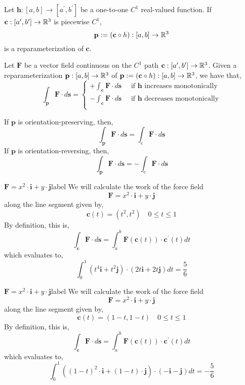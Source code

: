 \begin{defn}[Reparameterization]
	Let $\mathbf{h}:[a,b]\rightarrow[a^{\prime},b^{\prime}]$ be a one-to-one $C^1$ real-valued function. If $\mathbf{c}:[a^{\prime},b^{\prime}] \rightarrow \mathbb{R}^3$ is piecewise $C^1$,
	\[\mathbf{p} := (\mathbf{c} \circ h) : [a,b] \rightarrow \mathbb{R}^3\]
	is a reparameterization of $\mathbf{c}$.
\end{defn}

\begin{thm}
	Let $\mathbf{F}$ be a vector field continuous on the $C^1$ path $\mathbf{c}:[a^{\prime},b^{\prime}] \rightarrow \mathbb{R}^3$. Given a reparameterization $\mathbf{p}:[a,b] \rightarrow \mathbb{R}^3$ of $\mathbf{p} := (\mathbf{c} \circ h) : [a,b] \rightarrow \mathbb{R}^3$, we have that,
		\[\int_{\mathbf{p}} \mathbf{F} \cdot d \mathbf{s}=\left\{\begin{array}{c}
		+\int_{\mathbf{c}}\mathbf{F} \cdot d \mathbf{s} \quad \text { if } \mathbf{h} \text{ increases monotonically} \\
		- \int_{\mathbf{c}}\mathbf{F} \cdot d \mathbf{s} \quad \text { if } \mathbf{h} \text{ decreases monotonically} \\
		\end{array}\right.\]
\end{thm}

\begin{cor}
	If $\mathbf{p}$ is orientation-preserving, then,
	\[\int_{\mathbf{p}} \mathbf{F} \cdot d \mathbf{s}=\int_{\mathrm{c}} \mathbf{F} \cdot d \mathbf{s}\]
	If $\mathbf{p}$ is orientation-reversing, then,
	\[\int_{\mathbf{p}} \mathbf{F} \cdot d \mathbf{s}= - \int_{\mathrm{c}} \mathbf{F} \cdot d \mathbf{s}\]
\end{cor}

\begin{ex}{$\mathbf{F} = x^2 \cdot \mathbf{i} + y \cdot \mathbf{j}$}{label}
	We will calculate the work of the force field
	\[\mathbf{F} = x^2 \cdot \mathbf{i} + y \cdot \mathbf{j}\]
	along the line segment given by,
	\[\mathbf{c}(t) = (t^2, t^2) \quad 0 \leq t \leq 1\]
	By definition, this is, 
	\[\int_{\mathbf{c}} \mathbf{F} \cdot d \mathbf{s}=\int_a^b \mathbf{F}(\mathbf{c}(t)) \cdot \mathbf{c}^{\prime}(t) d t\]
	which evaluates to,
	\[\int_0^1\left(t^4 \mathbf{i}+t^2 \mathbf{j}\right) \cdot(2t \mathbf{i}+ 2t\mathbf{j}) d t = \frac{5}{6}\]
\end{ex}

\begin{ex}{$\mathbf{F} = x^2 \cdot \mathbf{i} + y \cdot \mathbf{j}$}{label}
	We will calculate the work of the force field
	\[\mathbf{F} = x^2 \cdot \mathbf{i} + y \cdot \mathbf{j}\]
	along the line segment given by,
	\[\mathbf{c}(t) = (1-t, 1-t) \quad 0 \leq t \leq 1\]
	By definition, this is, 
	\[\int_{\mathbf{c}} \mathbf{F} \cdot d \mathbf{s}=\int_a^b \mathbf{F}(\mathbf{c}(t)) \cdot \mathbf{c}^{\prime}(t) d t\]
	which evaluates to,
	\[\int_0^1\left((1-t)^2 \cdot \mathbf{i}+(1-t) \cdot \mathbf{j}\right) \cdot(-\mathbf{i}-\mathbf{j}) d t = -\frac{5}{6}\]
\end{ex}

